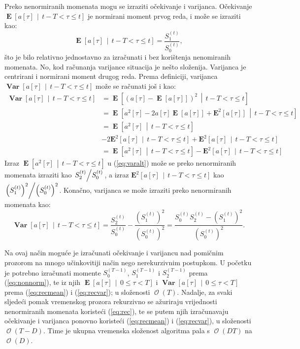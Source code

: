 \documentclass[lmodern, utf8, diplomski, numeric]{fer}
\newcommand{\E}[1]{\operatorname{\mathbf{E}}\q[#1\w]}
\newcommand{\Esq}[1]{\operatorname{\mathbf{E}^2}\q[#1\w]}
\newcommand{\Efromto}[2]{\operatorname{\mathbf{E}}\q[#1\, \middle\vert\, #2\w]}
\newcommand{\Esqfromto}[2]{\operatorname{\mathbf{E}^2}\q[#1\, \middle\vert\, #2\w]}
\newcommand{\Varfromto}[2]{\operatorname{\mathbf{Var}}\q[#1\, \middle\vert\, #2\w]}
\newcommand{\bigO}[1]{\operatorname{\mathcal{O}}\q(#1\w)}
\newcommand{\q}{\left}
\newcommand{\w}{\right}
\begin{document}
  Preko nenormiranih momenata mogu se izraziti očekivanje i varijanca.
  Očekivanje $\Efromto{a\q[\tau\w]}{t - T < \tau \le t}$ je normirani moment prvog reda, i može se izraziti kao:
  \begin{equation}
  \label{eq:recmean}
  \Efromto{a\q[\tau\w]}{t - T < \tau \le t} = \frac{S_1^{(t)}}{S_0^{(t)}},
  \end{equation}
  što je bilo relativno jednostavno za izračunati i bez korištenja nenomiranih momenata.
  No, kod računanja varijance situacija je nešto složenija.
  Varijanca je centrirani i normirani moment drugog reda.
  Prema definiciji, varijanca $\Varfromto{a\q[\tau\w]}{t - T < \tau \le t}$ može se računati još i kao:
  \begin{align}
    \Varfromto{a\q[\tau\w]}{t - T < \tau \le t} &= \Efromto{\q(a\q[\tau\w] - \E{a\q[\tau\w]} \w)^2}{t - T < \tau \le t} \nonumber \\
    &= \Efromto{a^2\q[\tau\w] - 2 a\q[\tau\w] \E{a\q[\tau\w]} + \Esq{a\q[\tau\w]}}{t - T < \tau \le t} \nonumber \\
    &= \Efromto{a^2\q[\tau\w]}{t - T < \tau \le t} \nonumber \\
    & - 2\Esqfromto{a\q[\tau\w]}{t - T < \tau \le t} + \Esqfromto{a\q[\tau\w]}{t - T < \tau \le t} \nonumber \\
    \label{eq:varalt}
    &= \Efromto{a^2\q[\tau\w]}{t - T < \tau \le t} - \Esqfromto{a\q[\tau\w]}{t - T < \tau \le t}
  \end{align}
  Izraz $\Efromto{a^2\q[\tau\w]}{t - T < \tau \le t}$ u (\ref{eq:varalt}) može se preko nenormiranih momenata izraziti kao $\q. S_2^{(t)} \middle/ S_0^{(t)} \w.$,
  a izraz $\Esqfromto{a\q[\tau\w]}{t - T < \tau \le t}$ kao $\q. \q(S_1^{(t)}\w)^2 \middle/ \q(S_0^{(t)}\w)^2 \w.$.
  Konačno, varijanca se može izraziti preko nenormiranih momenata kao:
  \begin{equation}
    \label{eq:recvar}
    \Varfromto{a\q[\tau\w]}{t - T < \tau \le t} = \frac{S_2^{(t)}}{S_0^{(t)}} - \frac{\q(S_1^{(t)}\w)^2}{\q(S_0^{(t)}\w)^2}
    = \frac{S_0^{(t)} S_2^{(t)} - \q(S_1^{(t)}\w)^2}{\q(S_0^{(t)}\w)^2}.
  \end{equation}
  
  Na ovaj način moguće je izračunati očekivanje i varijancu nad pomičnim prozorom na mnogo učinkovitiji način nego nerekurzivnim postupkom.
  U početku je potrebno izračunati momente $S_0^{(T - 1)}$, $S_1^{(T - 1)} $ i $S_2^{(T - 1)}$ prema (\ref{eq:nonnorm}), te iz njih $\Efromto{a\q[\tau\w]}{0 \le \tau < T}$ i $\Varfromto{a\q[\tau\w]}{0 \le \tau < T}$ prema (\ref{eq:recmean}) i (\ref{eq:recvar}); u složenosti $\bigO{T}$.
  Nadalje, za svaki sljedeći pomak vremenskog prozora rekurzivno se ažuriraju vrijednosti nenormiranih momenata koristeći (\ref{eq:rec}), te se putem njih izračunavaju očekivanje i varijanca ponovno koristeći (\ref{eq:recmean}) i (\ref{eq:recvar}), u složenosti $\bigO{T - D}$.
  Time je ukupna vremenska složenost algoritma pala s $\bigO{DT}$ na $\bigO{D}$.
\end{document}
